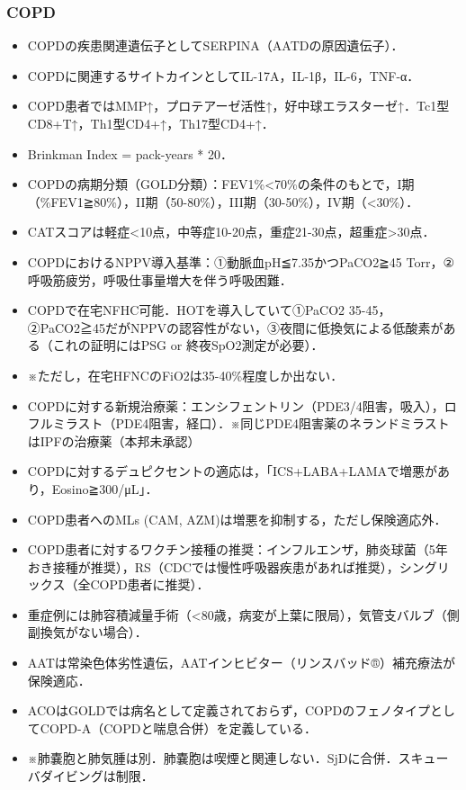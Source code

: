 \subsubsection{COPD}

\begin{itemize}
\item COPDの疾患関連遺伝子としてSERPINA（AATDの原因遺伝子）．
\item COPDに関連するサイトカインとしてIL-17A，IL-1β，IL-6，TNF-α．
\item COPD患者ではMMP↑，プロテアーゼ活性↑，好中球エラスターゼ↑．Tc1型CD8+T↑，Th1型CD4+↑，Th17型CD4+↑．
\item Brinkman Index = pack-years * 20．
\item COPDの病期分類（GOLD分類）：FEV1\%<70\%の条件のもとで，I期（\%FEV1≧80\%），II期（50-80\%），III期（30-50\%），IV期（<30\%）．
\item CATスコアは軽症<10点，中等症10-20点，重症21-30点，超重症>30点．


\item COPDにおけるNPPV導入基準：①動脈血pH≦7.35かつPaCO2≧45 Torr，②呼吸筋疲労，呼吸仕事量増大を伴う呼吸困難．
\item COPDで在宅NFHC可能．HOTを導入していて①PaCO2 35-45，②PaCO2≧45だがNPPVの認容性がない，③夜間に低換気による低酸素がある（これの証明にはPSG or 終夜SpO2測定が必要）．
\item ※ただし，在宅HFNCのFiO2は35-40\%程度しか出ない．
\item COPDに対する新規治療薬：エンシフェントリン（PDE3/4阻害，吸入），ロフルミラスト（PDE4阻害，経口）．※同じPDE4阻害薬のネランドミラストはIPFの治療薬（本邦未承認）
\item COPDに対するデュピクセントの適応は，「ICS+LABA+LAMAで増悪があり，Eosino≧300/μL」．
\item COPD患者へのMLs (CAM, AZM)は増悪を抑制する，ただし保険適応外．
\item COPD患者に対するワクチン接種の推奨：インフルエンザ，肺炎球菌（5年おき接種が推奨），RS（CDCでは慢性呼吸器疾患があれば推奨），シングリックス（全COPD患者に推奨）．
\item 重症例には肺容積減量手術（<80歳，病変が上葉に限局），気管支バルブ（側副換気がない場合）．
\item AATは常染色体劣性遺伝，AATインヒビター（リンスバッド®）補充療法が保険適応．
\item ACOはGOLDでは病名として定義されておらず，COPDのフェノタイプとしてCOPD-A（COPDと喘息合併）を定義している．
\item ※肺嚢胞と肺気腫は別．肺嚢胞は喫煙と関連しない．SjDに合併．スキューバダイビングは制限．

\end{itemize}

